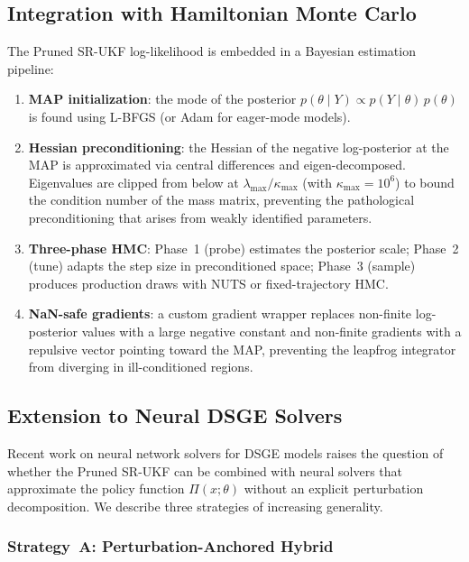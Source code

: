 \documentclass[12pt,a4paper]{article}
\begin{document}
\subsection{Integration with Hamiltonian Monte Carlo}

The Pruned SR-UKF log-likelihood is embedded in a Bayesian estimation
pipeline:
\begin{enumerate}[nosep]
\item \textbf{MAP initialization}: the mode of the posterior
$p(\theta \mid Y) \propto p(Y \mid \theta)\,p(\theta)$ is found
using L-BFGS (or Adam for eager-mode models).
\item \textbf{Hessian preconditioning}: the Hessian of the negative
log-posterior at the MAP is approximated via central differences and
eigen-decomposed. Eigenvalues are clipped from below at
$\lambda_{\max} / \kappa_{\max}$ (with $\kappa_{\max} = 10^6$) to
bound the condition number of the mass matrix, preventing the
pathological preconditioning that arises from weakly identified
parameters.
\item \textbf{Three-phase HMC}: Phase~1 (probe) estimates the
posterior scale; Phase~2 (tune) adapts the step size in
preconditioned space; Phase~3 (sample) produces production draws with
NUTS or fixed-trajectory HMC.
\item \textbf{NaN-safe gradients}: a custom gradient wrapper replaces
non-finite log-posterior values with a large negative constant and
non-finite gradients with a repulsive vector pointing toward the MAP,
preventing the leapfrog integrator from diverging in ill-conditioned
regions.
\end{enumerate}

\subsection{Extension to Neural DSGE Solvers}\label{sec:neural}

Recent work on neural network solvers for DSGE models
\citep{maliar2021deep} raises the question of whether the Pruned
SR-UKF can be combined with neural solvers that approximate the
policy function $\Pi(x;\theta)$ without an explicit perturbation
decomposition. We describe three strategies of increasing generality.

\subsubsection{Strategy~A: Perturbation-Anchored Hybrid}
\end{document}
